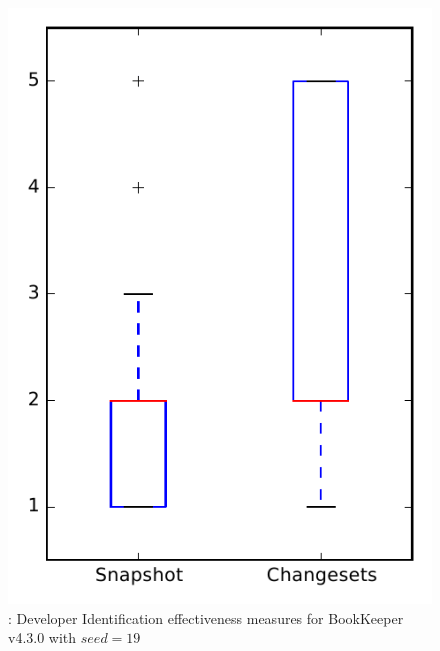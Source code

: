 
\begin{figure}
\centering
\includegraphics[height=0.4\textheight]{figures/dit_seed/rq1_bookkeeper_19}
\caption{\rtwo: Developer Identification effectiveness measures for BookKeeper v4.3.0 with $seed=19$}
\label{fig:dit_seed:rq1:bookkeeper}
\end{figure}
